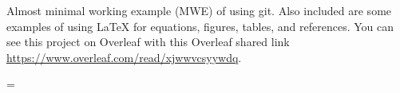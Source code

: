\vspace{-0.5cm}
\bigskip
\noindent
{Almost minimal working example (MWE) of using git. 
Also included are some examples of using {\LaTeX}  
for equations, figures, tables, and references. 
You can see this project on Overleaf with 
this Overleaf shared link 
\href{https://www.overleaf.com/read/xjwwvcsyywdq}{https://www.overleaf.com/read/xjwwvcsyywdq}.
}

\baselineskip=\normalbaselineskip
